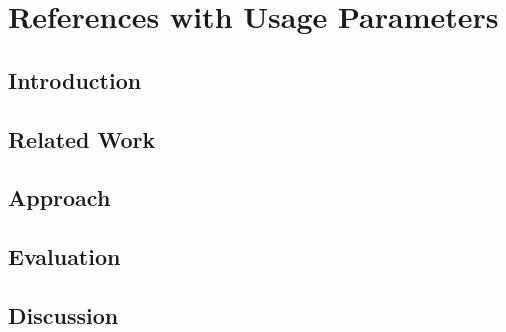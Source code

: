 \chapter{References with Usage Parameters}

\section{Introduction}
\Blindtext[1]

\section{Related Work}
\Blindtext[1]

\section{Approach}
\Blindtext[1]

\section{Evaluation}
\Blindtext[1]

\section{Discussion}
\Blindtext[1]
